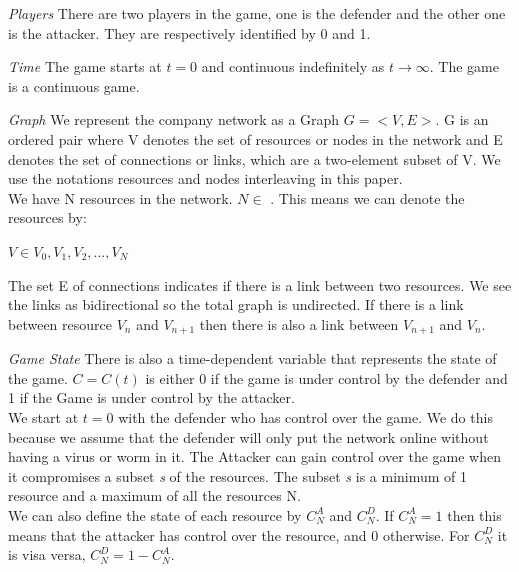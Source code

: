 \begin{description}
\item \textit{Players}  There are two players in the game, one is the defender and the other one is the attacker. They are respectively identified by 0 and 1.

\item \textit{Time}  The game starts at $t=0$ and continuous indefinitely as $t \rightarrow \infty$. The game is a continuous game.

\item \textit{Graph} We represent the company network as a Graph $G = < V,E>$. G is an ordered pair where V denotes the set of resources or nodes in the network and E denotes the set of connections or links, which are a two-element subset of V. We use the notations resources and nodes interleaving in this paper.\\
We have N resources in the network. $N \in $  . This means we can denote the resources by:
\begin{center}
$V \in {V_{0}, V_{1}, V_{2}, ... , V_{N} }$
\end{center}
The set E of connections indicates if there is a link between two resources. We see the links as bidirectional so the total graph is undirected. If there is a link between resource $V_{n}$ and $V_{n+1}$ then there is also a link between $V_{n+1}$ and $V_{n}$. 

\item \textit{Game State} There is also a time-dependent variable that represents the state of the game. $C=C(t)$ is either 0 if the game is under control by the defender and 1 if the Game is under control by the attacker. \\
We start at $t=0$ with the defender who has control over the game. We do this because we assume that the defender will only put the network online without having a virus or worm in it. The Attacker can gain control over the game when it compromises a subset \textit{s} of the resources. The subset \textit{s} is a minimum of 1 resource and a maximum of all the resources N. \\
 We can also define the state of each resource by $C^{A}_{N}$ and $C^{D}_{N}$. If $C^{A}_{N} = 1$ then this means that the attacker has control over the resource, and 0 otherwise. For $C^{D}_{N}$ it is visa versa, $C^{D}_{N} = 1 - C^{A}_{N}$.\\


\end{description}
